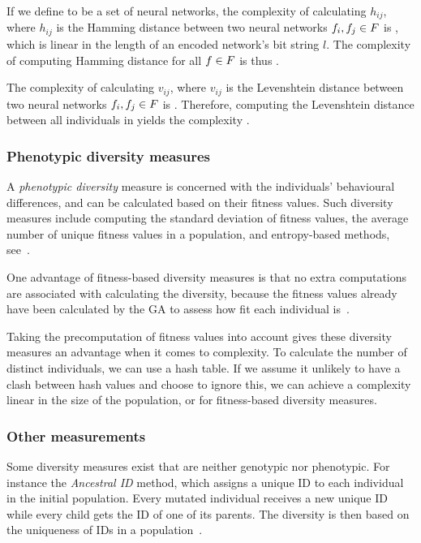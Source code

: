 If we define \indset{} to be a set of neural networks, the complexity of calculating $h_{ij}$, where $h_{ij}$ is the Hamming distance between two neural networks $f_i, f_j \in F$ is \bigO{\bitstringl}, which is linear in the length of an encoded network's bit string $l$. The complexity of computing Hamming distance for all $f \in F$ is thus \bigO{\indsetl^2 \cdot \bitstringl}. 

The complexity of calculating $v_{ij}$, where $v_{ij}$ is the Levenshtein distance between two neural networks $f_i, f_j \in F$ is \cite{Freeman:2006:CLN:1220835.1220895}. Therefore, computing the Levenshtein distance between all individuals in \indset{} yields the complexity .

\subsubsection{Phenotypic diversity measures}
A \emph{phenotypic diversity} measure is concerned with the individuals' behavioural differences, and can be calculated based on their fitness values. Such diversity measures include computing the standard deviation of fitness values, the average number of unique fitness values in a population, and entropy-based methods, see~\cite{1250187, 1266373}.

One advantage of fitness-based diversity measures is that no extra computations are associated with calculating the diversity, because the fitness values already have been calculated by the GA to assess how fit each individual is~\cite{Nguyen:2006:ASPGP}.

Taking the precomputation of fitness values into account gives these diversity measures an advantage when it comes to complexity. To calculate the number of distinct individuals, we can use a hash table. If we assume it unlikely to have a clash between hash values and choose to ignore this, we can achieve a complexity linear in the size of the population, or \bigO{\indsetl} for fitness-based diversity measures.

\subsubsection{Other measurements}
Some diversity measures exist that are neither genotypic nor phenotypic. For instance the \emph{Ancestral ID} method, which assigns a unique ID to each individual in the initial population. Every mutated individual receives a new unique ID while every child gets the ID of one of its parents. The diversity is then based on the uniqueness of IDs in a population~\cite{1250187}.
